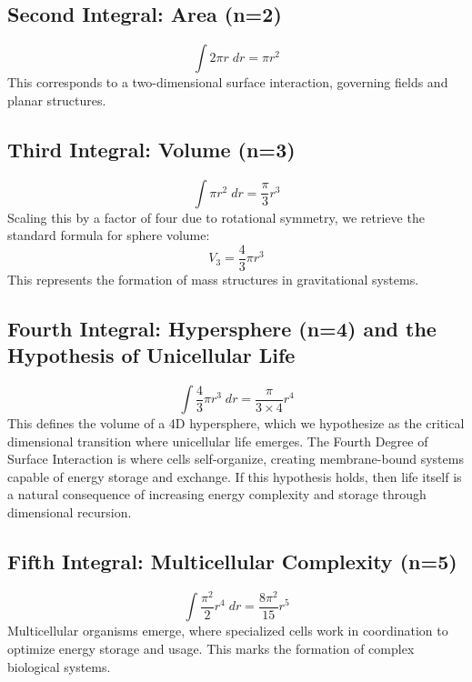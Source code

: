 \documentclass{article}
\begin{document}
\subsection{Second Integral: Area (n=2)}
\begin{equation}
\int 2\pi r \; dr = \pi r^2
\end{equation}
This corresponds to a two-dimensional surface interaction, governing fields and planar structures.

\subsection{Third Integral: Volume (n=3)}
\begin{equation}
\int \pi r^2 \; dr = \frac{\pi}{3} r^3
\end{equation}
Scaling this by a factor of four due to rotational symmetry, we retrieve the standard formula for sphere volume:
\begin{equation}
V_3 = \frac{4}{3} \pi r^3
\end{equation}
This represents the formation of mass structures in gravitational systems.

\subsection{Fourth Integral: Hypersphere (n=4) and the Hypothesis of Unicellular Life}
\begin{equation}
\int \frac{4}{3} \pi r^3 \; dr = \frac{\pi}{3 \times 4} r^4
\end{equation}
This defines the volume of a 4D hypersphere, which we hypothesize as the critical dimensional transition where unicellular life emerges. The Fourth Degree of Surface Interaction is where cells self-organize, creating membrane-bound systems capable of energy storage and exchange. If this hypothesis holds, then life itself is a natural consequence of increasing energy complexity and storage through dimensional recursion.

\subsection{Fifth Integral: Multicellular Complexity (n=5)}
\begin{equation}
\int \frac{\pi^2}{2} r^4 \; dr = \frac{8\pi^2}{15} r^5
\end{equation}
Multicellular organisms emerge, where specialized cells work in coordination to optimize energy storage and usage. This marks the formation of complex biological systems.
\end{document}
